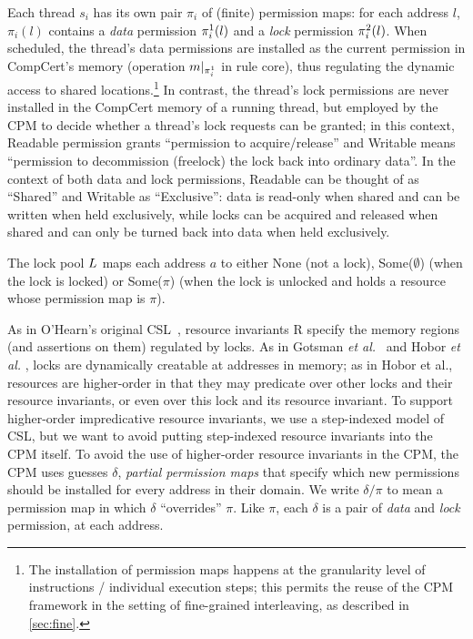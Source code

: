 Each thread $s_i$ has its own pair $\pi_i$ of (finite) permission
maps: for each address $l$, $\pi_i(l)$ contains a \emph{data} permission
$\pi_i^1(l)$ and a \emph{lock} permission $\pi_i^2(l)$.
When scheduled, the thread's data permissions are installed as the
current permission in CompCert's memory (operation
$m |_{\pi^1_i}$ in rule {\sf core}), thus regulating the dynamic
access to shared locations.\footnote{The installation of permission
  maps happens at the granularity level of instructions / individual
  execution steps; this permits the reuse of the CPM framework in the
  setting of fine-grained interleaving, as described in \cref{sec:fine}. } In
contrast, the thread's lock permissions are never installed in the
CompCert memory of a running thread, but employed by the CPM to decide
whether a thread's lock requests can be granted; in this context,
Readable permission grants ``permission to acquire/release'' and
Writable means ``permission to decommission \textsf{(freelock)} the
lock back into ordinary data''.  In the context of both data and lock
permissions, Readable can be thought of as ``Shared'' and Writable as
``Exclusive'': data is read-only when shared and can be written when
held exclusively, while locks can be acquired and released when shared
and can only be turned back into data when held exclusively.

The lock pool $L$ maps each address $a$
to either None (not a lock),
Some($\emptyset$) (when the lock is locked) or
Some($\pi$) (when the lock is unlocked and
holds a resource whose permission map is $\pi$).

As in O'Hearn's original CSL~\cite{ohearn07:tcs}, resource invariants R specify the memory regions (and assertions on them) regulated by locks.  As in Gotsman \emph{et al.}~\cite{gotsman07} and Hobor \emph{et al.} \cite{hobor08:esop}, locks are dynamically creatable at addresses in memory; as in Hobor et al., resources are higher-order in that they may predicate over other locks and their resource invariants, or even over this lock and its resource invariant.  To support higher-order impredicative resource invariants, we use a step-indexed model of CSL, but we want to avoid putting step-indexed resource invariants into the CPM itself.
To avoid the use of higher-order resource invariants in the CPM, the CPM
uses guesses $\delta$, \emph{partial permission maps} that specify
which new permissions should be installed for every address in their
domain.  We write $\delta/\pi$ to mean a permission map in which
$\delta$ ``overrides'' $\pi$.  Like $\pi$, each $\delta$ is a pair of
\emph{data} and \emph{lock} permission, at each address.

